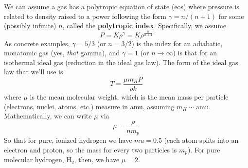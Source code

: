 \documentclass[10pt]{article}
\numberwithin{equation}{section}
\newcommand{\n}{\noindent}
\begin{document}
		\n We can assume a gas has a polytropic equation of state (eos) where pressure is related to density raised to a power following the form $\gamma = n/(n+1)$ for some (possibly infinite) $n$, called the \textbf{polytropic index}. Specifically, we assume
		\begin{equation}
			\label{eq:acc:21} P = K\rho^\gamma = K\rho^{\frac{n}{n+1}}
		\end{equation}
		As concrete examples, $\gamma=5/3$ (or $n=3/2$) is the index for an adiabatic, monatomic gas (yes, \emph{that} gamma), and $\gamma=1$ (or $n\to \infty$) is that for an isothermal ideal gas (reduction in the ideal gas law). The form of the ideal gas law that we'll use is
		\begin{equation}
			\label{eq:acc:22} T = \frac{\mu m_H P}{\rho k}
		\end{equation}
		where $\mu$ is the mean molecular weight, which is the mean mass per particle (electrons, nuclei, atoms, etc.) measure in amu, assuming $m_H\sim \mathrm{amu}$. Mathematically, we can write $\mu$ via
		\begin{equation}
			\label{eq:acc:23} \mu = \frac{\rho}{n m_p}
		\end{equation}
		So that for pure, ionized hydrogen we have $mu = 0.5$ (each atom splits into an electron and proton, so the mass for every two particles is $m_p$). For pure molecular hydrogen, H$_2$, then, we have $\mu = 2$.\\
		
\end{document}
